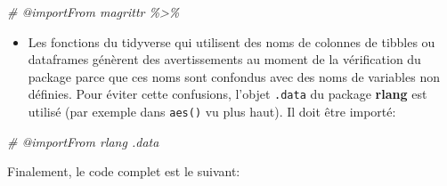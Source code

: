 \documentclass[
  12pt,
  french,
  a4paper,
  extrafontsizes,onecolumn,openright
  ]{memoir}
\newenvironment{Shaded}{\begin{snugshade}}{\end{snugshade}}
\newcommand{\CommentTok}[1]{\textcolor[rgb]{0.56,0.35,0.01}{\textit{#1}}}
\providecommand{\tightlist}{%
  \setlength{\itemsep}{0pt}\setlength{\parskip}{0pt}}
\begin{document}
\scriptsize

\begin{Shaded}
\begin{Highlighting}[]
\CommentTok{\#\textquotesingle{} @importFrom magrittr \textasciigrave{}\%\textgreater{}\%\textasciigrave{}}
\end{Highlighting}
\end{Shaded}

\normalsize

\begin{itemize}
\tightlist
\item
  Les fonctions du tidyverse qui utilisent des noms de colonnes de tibbles ou dataframes génèrent des avertissements au moment de la vérification du package parce que ces noms sont confondus avec des noms de variables non définies.
  Pour éviter cette confusions, l'objet \texttt{.data} du package \textbf{rlang} est utilisé (par exemple dans \texttt{aes()} vu plus haut).
  Il doit être importé:
\end{itemize}

\scriptsize

\begin{Shaded}
\begin{Highlighting}[]
\CommentTok{\#\textquotesingle{} @importFrom rlang .data}
\end{Highlighting}
\end{Shaded}

\normalsize

Finalement, le code complet est le suivant:

\scriptsize
\end{document}
